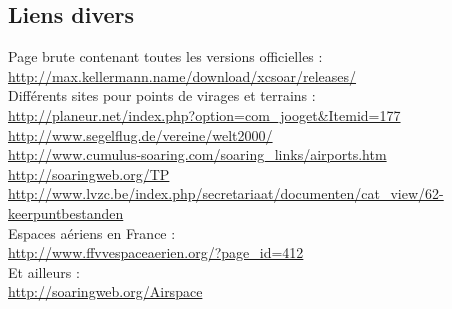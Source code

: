 \documentclass{article}
\begin{document}
\subsection{Liens divers}
\noindent
\label{LiensDivers}
\begin{flushleft}
Page brute contenant toutes les versions officielles :\\ \url{http://max.kellermann.name/download/xcsoar/releases/}\\
Différents sites pour points de virages et terrains :\\
\url{http://planeur.net/index.php?option=com_jooget&Itemid=177}\\
\url{http://www.segelflug.de/vereine/welt2000/}\\
\url{http://www.cumulus-soaring.com/soaring_links/airports.htm}\\
\url{http://soaringweb.org/TP}\\
\url{http://www.lvzc.be/index.php/secretariaat/documenten/cat_view/62-keerpuntbestanden}\\
Espaces aériens en France :\\
\url{http://www.ffvvespaceaerien.org/?page_id=412}\\
Et ailleurs :\\
\url{http://soaringweb.org/Airspace}\\
\end{flushleft}
%
\end{document}
